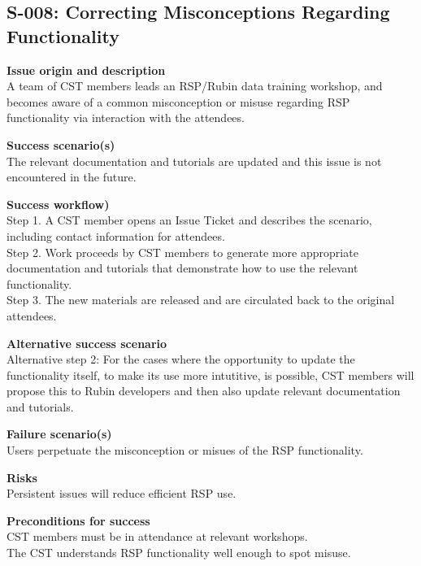 \subsection{S-008: Correcting Misconceptions Regarding Functionality}

\textbf{Issue origin and description} \\
A team of CST members leads an RSP/Rubin data training workshop, and becomes aware of a common misconception or misuse regarding RSP functionality via interaction with the attendees.

\textbf{Success scenario(s)} \\
The relevant documentation and tutorials are updated and this issue is not encountered in the future.

\textbf{Success workflow)} \\
Step 1. A CST member opens an Issue Ticket and describes the scenario, including contact information for attendees. \\
Step 2. Work proceeds by CST members to generate more appropriate documentation and tutorials that demonstrate how to use the relevant functionality. \\
Step 3. The new materials are released and are circulated back to the original attendees.

\textbf{Alternative success scenario} \\
Alternative step 2: For the cases where the opportunity to update the functionality itself, to make its use more intutitive, is possible, CST members will propose this to Rubin developers and then also update relevant documentation and tutorials.

\textbf{Failure scenario(s)} \\
Users perpetuate the misconception or misues of the RSP functionality.

\textbf{Risks} \\
Persistent issues will reduce efficient RSP use.

\textbf{Preconditions for success} \\
CST members must be in attendance at relevant workshops. \\
The CST understands RSP functionality well enough to spot misuse.
